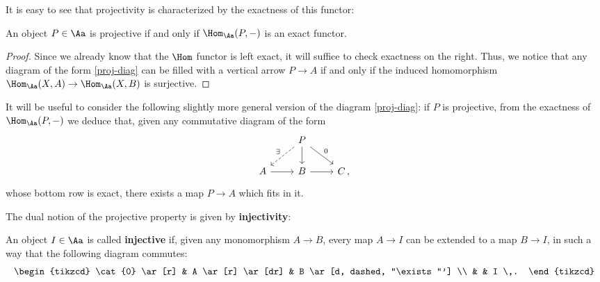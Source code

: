 It is easy to see that projectivity is characterized
by the exactness of this functor:
\begin{prop}
    An object $P \in \Aa$ is projective if and only
    if $\Hom_{\Aa}(P,-)$ is an exact functor.
    \begin{proof}
        Since we already know that the $\Hom$
        functor is left exact, it will suffice to check
        exactness on the right. Thus, we notice that
        any diagram of the form
        \eqref{proj-diag}
        can be filled with a vertical arrow $P \to A$
        if and only if the induced homomorphism
        $\Hom_{\Aa}(X,A) \to \Hom_{\Aa}(X,B)$ is surjective.
    \end{proof}
\end{prop}

\begin{rmk}
    It will be useful to consider the following slightly more
    general version of the diagram \eqref{proj-diag}:
    if $P$ is projective, from the exactness of $\Hom_{\Aa}(P,-)$
    we deduce that, given any commutative diagram of the form
    \begin{equation*}
        \begin{tikzcd}
            & P \ar[d] \ar[dr, "0"] \ar[dl, "\exists"', dashed] & \\
            A \ar[r] & B \ar[r] & C\,,
        \end{tikzcd}
    \end{equation*}
    whose bottom row is exact, there exists a map $P \to A$ 
    which fits in it.
\end{rmk}

The dual notion of the projective property
is given by \textbf{injectivity}:

\begin{df}
    An object $I \in \Aa$ is called \textbf{injective} if,
    given any monomorphism $A \to B$, 
    every map $A \to I$ can be extended to a map $B \to I$,
    in such a way that the following diagram commutes:
    \begin{equation*}
        \begin{tikzcd}
            \cat{0} \ar[r] & A \ar[r] \ar[dr] & B \ar[d, dashed, "\exists"'] \\
            & & I  \,.
        \end{tikzcd}
    \end{equation*}
\end{df}

